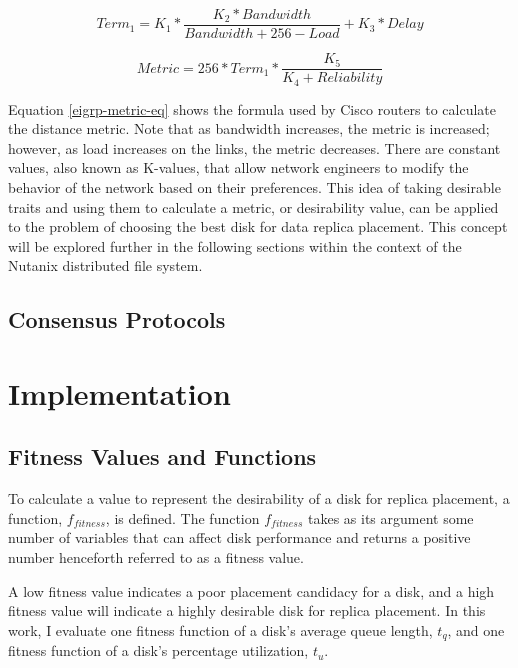 \documentclass[12pt]{article}
\begin{document}
  \begin{equation}
    Term_{1} = K_{1} * \frac{K_{2} * Bandwidth}{Bandwidth + 256 - Load} + K_{3} * Delay
  \end{equation}

  \begin{equation} \label{eigrp-metric-eq}
    Metric = 256 * Term_{1} * \frac{K_{5}}{K_{4} + Reliability}
  \end{equation}

  Equation \ref{eigrp-metric-eq} shows the formula used by Cisco routers to
  calculate the distance metric. Note that as bandwidth increases, the metric
  is increased; however, as load increases on the links, the metric decreases.
  There are constant values, also known as K-values, that allow network
  engineers to modify the behavior of the network based on their preferences.
  This idea of taking desirable traits and using them to calculate a metric, or
  desirability value, can be applied to the problem of choosing the best disk
  for data replica placement. This concept will be explored further in the
  following sections within the context of the Nutanix distributed file system.

  \subsection{Consensus Protocols}
  \label{sec:consensus}



\newpage
\FloatBarrier
\section{Implementation}

  \subsection{Fitness Values and Functions} \label{section-fitness}

  To calculate a value to represent the desirability of a disk for replica
  placement, a function, $f_{fitness}$, is defined. The function $f_{fitness}$
  takes as its argument some number of variables that can affect disk
  performance and returns a positive number henceforth referred to as a fitness
  value.
  
  A low fitness value indicates a poor placement candidacy for a disk, and a
  high fitness value will indicate a highly desirable disk for replica
  placement. In this work, I evaluate one fitness function of a disk's average
  queue length, $t_{q}$, and one fitness function of
  a disk's percentage utilization, $t_{u}$.
\end{document}
